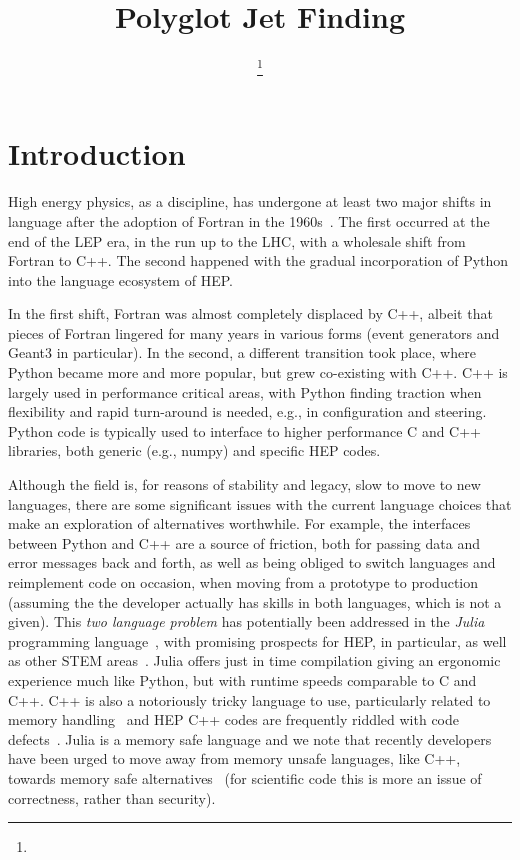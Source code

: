 \documentclass{webofc}
\title{Polyglot Jet Finding}
\author{\firstname{Graeme Andrew} \lastname{Stewart}\inst{1}\fnsep\thanks{\email{graeme.andrew.stewart@cern.ch}} \and
        \firstname{Philippe} \lastname{Gras}\inst{2}\fnsep \and
        \firstname{Benedikt} \lastname{Hegner}\inst{1}\fnsep \and
        \firstname{Atell} \lastname{Krasnopolski}\inst{3}
}
\institute{CERN, Esplanade des Particules 1, Geneva, Switzerland
\and
           IRFU, CEA, Université Paris-Saclay, Gif-sur-Yvette, France
\and
           Taras Shevchenko National University of Kyiv, Ukraine
          }
\begin{document}
\maketitle

\section{Introduction}
\label{sec:introduction}

High energy physics, as a discipline, has undergone at least two major shifts in
language after the adoption of Fortran in the 1960s~\cite{pivarski2022}. The
first occurred at the end of the LEP era, in the run up to the LHC, with a
wholesale shift from Fortran to C++. The second happened with the gradual
incorporation of Python into the language ecosystem of HEP.

In the first shift, Fortran was almost completely displaced by C++, albeit that
pieces of Fortran lingered for many years in various forms (event generators and
Geant3 in particular). In the second, a different transition took place, where
Python became more and more popular, but grew co-existing with C++. C++ is
largely used in performance critical areas, with Python finding traction when
flexibility and rapid turn-around is needed, e.g., in configuration and
steering. Python code is typically used to interface to higher performance C and
C++ libraries, both generic (e.g., numpy) and specific HEP codes.

Although the field is, for reasons of stability and legacy, slow to move to new
languages, there are some significant issues with the current language choices
that make an exploration of alternatives worthwhile. For example, the interfaces
between Python and C++ are a source of friction, both for passing data and error
messages back and forth, as well as being obliged to switch languages and
reimplement code on occasion, when moving from a prototype to production
(assuming the the developer actually has skills in both languages, which is not
a given). This \emph{two language problem} has potentially been addressed in the
\emph{Julia} programming
language~\cite{bib:julia_freshapproach,10.1145/3276490}, with promising
prospects for HEP, in particular, \cite{Stanitzki:2020bnx,eschle2023potential} as well as
other STEM areas~\cite{perkel-julia-science}. Julia offers just in time
compilation giving an ergonomic experience much like Python, but with runtime
speeds comparable to C and C++. C++ is also a notoriously tricky language to
use, particularly related to memory handling~\cite{ms-security-2019} and HEP C++
codes are frequently riddled with code defects~\cite{Naumann_2014}. Julia is
a memory safe language and we note that recently developers have been
urged to move away from memory unsafe languages, like C++, towards memory safe
alternatives~\cite{nsa-cybersecurity} (for scientific code this is more an
issue of correctness, rather than security).
\end{document}
